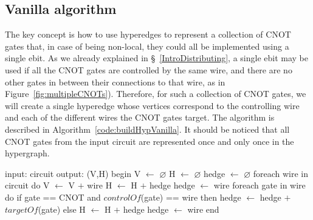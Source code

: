 \subsection{Vanilla algorithm}
\label{Vanilla}

The key concept is how to use hyperedges to represent a collection of CNOT gates that, in case of being non-local, they could all be implemented using a single ebit. As we already explained in \S~\ref{IntroDistributing}, a single ebit may be used if all the CNOT gates are controlled by the same wire, and there are no other gates in between their connections to that wire, as in Figure~\ref{fig:multipleCNOTs}). Therefore, for such a collection of CNOT gates, we will create a single hyperedge whose vertices correspond to the controlling wire and each of the different wires the CNOT gates target. The algorithm is described in Algorithm~\ref{code:buildHypVanilla}. It should be noticed that all CNOT gates from the input circuit are represented once and only once in the hypergraph. %

\begin{algorithm}[caption={Builds the hypergraph of a given circuit. \(H\) may contain multiple hyperedges connecting the same vertices.}, label={code:buildHypVanilla}]
input: circuit
output: (V,H)
begin
  V $\gets$ $\varnothing$
  H $\gets$ $\varnothing$
  hedge $\gets$ $\varnothing$
  foreach wire in circuit do
    V $\gets$ V $+$ {wire}
    H $\gets$ H $+$ {hedge}
    hedge $\gets$ {wire}
    foreach gate in wire do
      if gate == CNOT and $controlOf$(gate) == wire then
        hedge $\gets$ hedge $+$ {$targetOf$(gate)}
      else
        H $\gets$ H $+$ {hedge}
        hedge $\gets$ {wire}
end
\end{algorithm}


